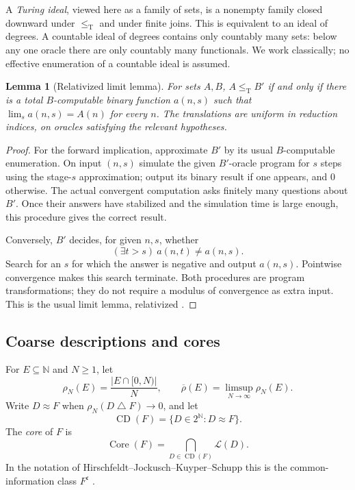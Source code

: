 \documentclass[11pt,letterpaper]{article}
\newtheorem{lemma}[theorem]{Lemma}
\theoremstyle{definition}
\theoremstyle{remark}\newtheorem{remark}[theorem]{Remark}
\numberwithin{equation}{section}
\newcommand{\N}{\mathbb N}
\newcommand{\Cantor}{2^{\N}}
\newcommand{\leT}{\leq_{\mathrm T}}
\newcommand{\Low}{\mathcal L}
\newcommand{\Core}{\operatorname{Core}}
\newcommand{\CD}{\operatorname{CD}}
\newcommand{\sd}{\mathbin{\triangle}}
\newcommand{\updens}{\overline\rho}
\begin{document}
A \emph{Turing ideal}, viewed here as a family of sets, is a nonempty family closed downward under $\leT$ and under finite joins. This is equivalent to an ideal of degrees. A countable ideal of degrees contains only countably many sets: below any one oracle there are only countably many functionals. We work classically; no effective enumeration of a countable ideal is assumed.

\begin{lemma}[Relativized limit lemma]\label{cr13:lem:limit}
For sets $A,B$, $A\leT B'$ if and only if there is a total $B$-computable binary function $a(n,s)$ such that $\lim_s a(n,s)=A(n)$ for every $n$. The translations are uniform in reduction indices, on oracles satisfying the relevant hypotheses.
\end{lemma}
\begin{proof}
For the forward implication, approximate $B'$ by its usual $B$-computable enumeration. On input $(n,s)$ simulate the given $B'$-oracle program for $s$ steps using the stage-$s$ approximation; output its binary result if one appears, and $0$ otherwise. The actual convergent computation asks finitely many questions about $B'$. Once their answers have stabilized and the simulation time is large enough, this procedure gives the correct result.

Conversely, $B'$ decides, for given $n,s$, whether
\[
             (\exists t>s)\ a(n,t)\ne a(n,s).
\]
Search for an $s$ for which the answer is negative and output $a(n,s)$. Pointwise convergence makes this search terminate. Both procedures are program transformations; they do not require a modulus of convergence as extra input. This is the usual limit lemma, relativized \cite[Lemma 2.18]{JS}.
\end{proof}

\subsection{Coarse descriptions and cores}
For $E\subseteq\N$ and $N\ge1$, let
\[
 \rho_N(E)=\frac{|E\cap[0,N)|}{N},\qquad
 \updens(E)=\limsup_{N\to\infty}\rho_N(E).
\]
Write $D\approx F$ when $\rho_N(D\sd F)\to0$, and let
\[
                  \CD(F)=\{D\in\Cantor:D\approx F\}.
\]
The \emph{core} of $F$ is
\begin{equation}\label{cr13:eq:core}
             \Core(F)=\bigcap_{D\in\CD(F)}\Low(D).
\end{equation}
In the notation of Hirschfeldt--Jockusch--Kuyper--Schupp this is the common-information class $F^{\mathfrak c}$ \cite{HJKS}.
\end{document}
